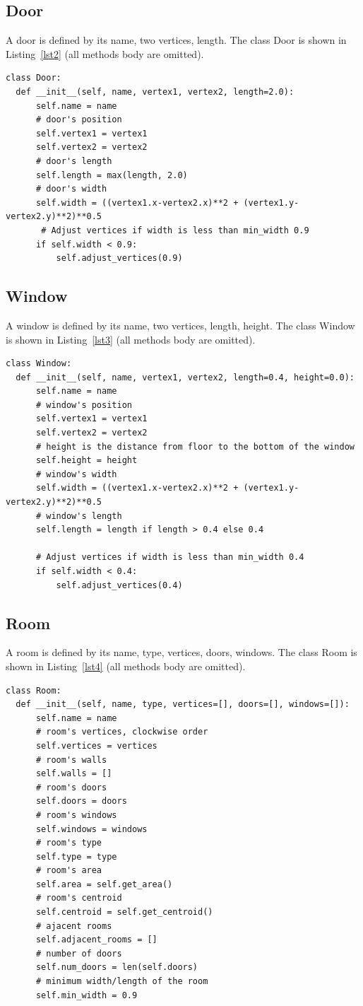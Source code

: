 \documentclass[]{article}
\begin{document}
\subsection{Door}
A door is defined by its name, two vertices, length. The class Door is shown in Listing~\ref{lst2} (all methods body are omitted).
\begin{lstlisting}[caption=Door class, label=lst2]
class Door:
  def __init__(self, name, vertex1, vertex2, length=2.0):
      self.name = name
      # door's position 
      self.vertex1 = vertex1
      self.vertex2 = vertex2
      # door's length
      self.length = max(length, 2.0)
      # door's width
      self.width = ((vertex1.x-vertex2.x)**2 + (vertex1.y-vertex2.y)**2)**0.5
       # Adjust vertices if width is less than min_width 0.9
      if self.width < 0.9:
          self.adjust_vertices(0.9)
\end{lstlisting}

\subsection{Window}
A window is defined by its name, two vertices, length, height. The class Window is shown in Listing~\ref{lst3} (all methods body are omitted).
\begin{lstlisting}[caption=Window class, label=lst3]
class Window:
  def __init__(self, name, vertex1, vertex2, length=0.4, height=0.0):
      self.name = name
      # window's position 
      self.vertex1 = vertex1
      self.vertex2 = vertex2
      # height is the distance from floor to the bottom of the window
      self.height = height
      # window's width
      self.width = ((vertex1.x-vertex2.x)**2 + (vertex1.y-vertex2.y)**2)**0.5
      # window's length
      self.length = length if length > 0.4 else 0.4

      # Adjust vertices if width is less than min_width 0.4
      if self.width < 0.4:
          self.adjust_vertices(0.4)
\end{lstlisting}

\subsection{Room}
A room is defined by its name, type, vertices, doors, windows. The class Room is shown in Listing~\ref{lst4} (all methods body are omitted).
\begin{lstlisting}[caption=Room class, label=lst4]
class Room:
  def __init__(self, name, type, vertices=[], doors=[], windows=[]):
      self.name = name
      # room's vertices, clockwise order
      self.vertices = vertices
      # room's walls
      self.walls = []
      # room's doors
      self.doors = doors
      # room's windows
      self.windows = windows
      # room's type
      self.type = type
      # room's area
      self.area = self.get_area()
      # room's centroid
      self.centroid = self.get_centroid()
      # ajacent rooms
      self.adjacent_rooms = []
      # number of doors
      self.num_doors = len(self.doors)
      # minimum width/length of the room
      self.min_width = 0.9
\end{lstlisting}
\end{document}
